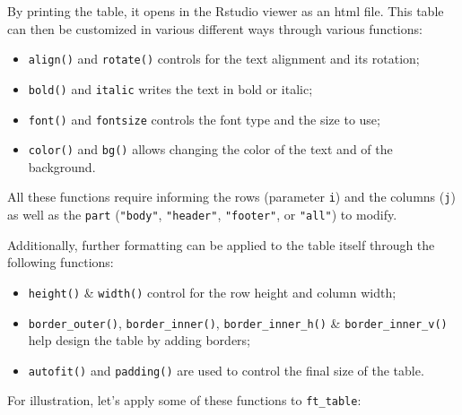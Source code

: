 \documentclass[
]{book}
\providecommand{\tightlist}{%
  \setlength{\itemsep}{0pt}\setlength{\parskip}{0pt}}
\begin{document}
By printing the table, it opens in the Rstudio viewer as an html file. This table can then be customized in various different ways through various functions:

\begin{itemize}
\tightlist
\item
  \texttt{align()} and \texttt{rotate()} controls for the text alignment and its rotation;
\item
  \texttt{bold()} and \texttt{italic} writes the text in bold or italic;
\item
  \texttt{font()} and \texttt{fontsize} controls the font type and the size to use;
\item
  \texttt{color()} and \texttt{bg()} allows changing the color of the text and of the background.
\end{itemize}

All these functions require informing the rows (parameter \texttt{i}) and the columns (\texttt{j}) as well as the \texttt{part} (\texttt{"body"}, \texttt{"header"}, \texttt{"footer"}, or \texttt{"all"}) to modify.

Additionally, further formatting can be applied to the table itself through the following functions:

\begin{itemize}
\tightlist
\item
  \texttt{height()} \& \texttt{width()} control for the row height and column width;
\item
  \texttt{border\_outer()}, \texttt{border\_inner()}, \texttt{border\_inner\_h()} \& \texttt{border\_inner\_v()} help design the table by adding borders;
\item
  \texttt{autofit()} and \texttt{padding()} are used to control the final size of the table.
\end{itemize}

For illustration, let's apply some of these functions to \texttt{ft\_table}:
\end{document}
